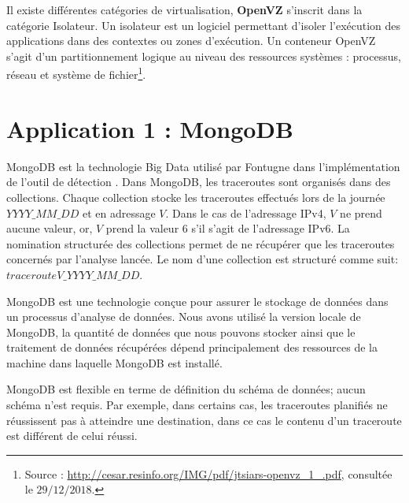 \begin{tcolorbox}
	
	Il existe différentes catégories de virtualisation, \textbf{OpenVZ} s'inscrit dans la catégorie Isolateur. Un isolateur est un logiciel permettant d'isoler l'exécution des applications dans des contextes ou zones d'exécution. Un conteneur OpenVZ s'agit d'un partitionnement logique au niveau des ressources systèmes : processus, réseau et système de fichier\footnote{Source : \url{http://cesar.resinfo.org/IMG/pdf/jtsiars-openvz_1_.pdf}, consultée le $29/12/2018$.}.
\end{tcolorbox}


\section{Application 1 : MongoDB}

MongoDB est la technologie Big Data utilisé par  Fontugne  dans l'implémentation de l'outil de détection \cite{InternetHealthReport}. Dans MongoDB, les traceroutes sont organisés  dans des collections.  Chaque collection stocke les traceroutes effectués lors de la journée $YYYY\_MM\_DD$ et en adressage $V$. Dans le  cas de l'adressage IPv4, $V$  ne prend aucune valeur,  or, $V$ prend la valeur $6$ s'il s'agit de l'adressage IPv6.  La nomination structurée des collections permet de ne récupérer que les traceroutes concernés par l'analyse lancée. Le nom d'une collection est structuré comme suit: 	$tracerouteV\_YYYY\_MM\_DD$.
 

 
 MongoDB est une technologie conçue pour assurer  le stockage de données dans un processus d'analyse de données. Nous avons utilisé la version locale de MongoDB, la quantité de données que nous pouvons stocker ainsi que le traitement de données récupérées dépend principalement des ressources de la machine dans laquelle MongoDB est installé.
 
    MongoDB est flexible en terme de définition du schéma de données; aucun schéma n'est requis.   Par exemple, dans certains cas, les traceroutes planifiés ne réussissent pas à atteindre une destination, dans ce cas le contenu d'un traceroute est différent de celui réussi. 
    
